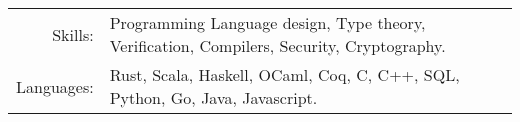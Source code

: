 \begin{tabular}{rl}
Skills:& Programming Language design, Type theory, Verification, Compilers, Security, Cryptography.\\
Languages: & Rust, Scala, Haskell, OCaml, Coq, C, C++, SQL, Python, Go, Java, Javascript. \\
\end{tabular}


